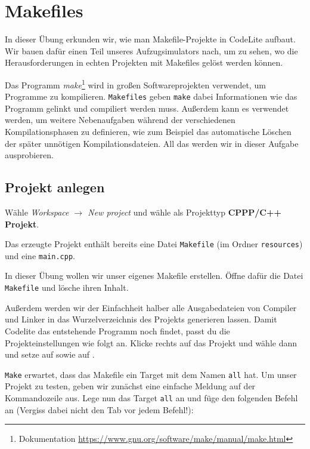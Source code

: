 \section{\ExercisePrefixElevator Makefiles \optional}

\optionaltextbox

In dieser Übung erkunden wir, wie man Makefile-Projekte in CodeLite aufbaut.
Wir bauen dafür einen Teil unseres Aufzugsimulators nach, um zu sehen, wo die Herausforderungen in echten Projekten mit Makefiles gelöst werden können.

Das Programm \emph{make}\footnote{Dokumentation \url{https://www.gnu.org/software/make/manual/make.html}} wird in großen Softwareprojekten verwendet, um Programme zu kompilieren.
\texttt{Makefiles} geben \texttt{make} dabei Informationen wie das Programm gelinkt und compiliert werden muss.
Außerdem kann es verwendet werden, um weitere Nebenaufgaben während der verschiedenen Kompilationsphasen zu definieren, wie zum Beispiel das automatische Löschen der später unnötigen Kompilationsdateien.
All das werden wir in dieser Aufgabe ausprobieren.

\subsection{Projekt anlegen}
Wähle \emph{Workspace $\to$ New project} und wähle als Projekttyp \textbf{CPPP/C++ Projekt}.

Das erzeugte Projekt enthält bereits eine Datei \texttt{Makefile} (im Ordner \texttt{resources}) und eine \texttt{main.cpp}.

In dieser Übung wollen wir unser eigenes Makefile erstellen. Öffne dafür die Datei \texttt{Makefile} und lösche ihren Inhalt. 

Außerdem werden wir der Einfachheit halber alle Ausgabedateien von Compiler und Linker in das Wurzelverzeichnis des Projekts generieren lassen.
Damit Codelite das entstehende Programm noch findet, passt du die Projekteinstellungen wie folgt an.
Klicke rechts auf das Projekt und wähle dann  und setze  auf  sowie  auf .

\texttt{Make} erwartet, dass das Makefile ein Target mit dem Namen \lstinline{all} hat.
Um unser Projekt zu testen, geben wir zunächst eine einfache Meldung auf der Kommandozeile aus.
Lege nun das Target \lstinline{all} an und füge den folgenden Befehl an (Vergiss dabei nicht den Tab vor jedem Befehl!):

